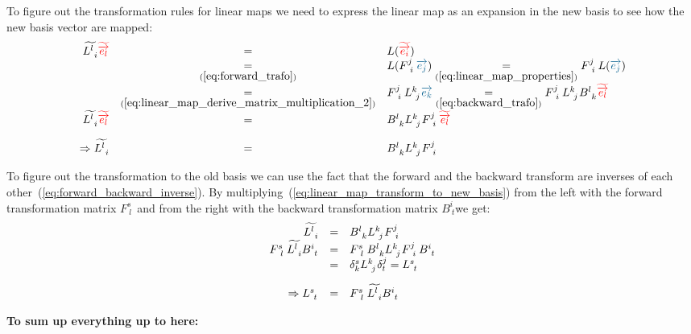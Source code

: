 To figure out the transformation rules for linear maps we need to express the linear map
as an expansion in the new basis to see how the new basis vector are mapped:
\begin{equation}
    \label{eq:linear_map_transform_to_new_basis}  
    \begin{array}{rcl}
        \widetilde{L^{l~}_{~i}}\hdbtv{l} & = & L(\hdbtv{i}) \\
        & \underset{(\ref{eq:forward_trafo})}{=} &
        L(F^{j~}_{~i}\hdbv{j}) \underset{(\ref{eq:linear_map_properties})}{=}
        F^{j~}_{~i}L(\hdbv{j}) \\
        & \underset{(\ref{eq:linear_map_derive_matrix_multiplication_2})}{=} &
        F^{j~}_{~i}L^{k~}_{~j}\hdbv{k} \underset{(\ref{eq:backward_trafo})}{=}
        F^{j~}_{~i}L^{k~}_{~j} B^{l~}_{~k}\hdbtv{l} \\
        \widetilde{L^{l~}_{~i}}\hdbtv{l} & = &
        B^{l~}_{~k} L^{k~}_{~j} F^{j~}_{~i} \hdbtv{l} \\
        \noalign{\vskip10pt}
        \Rightarrow \widetilde{L^{l~}_{~i}} & = &
        B^{l~}_{~k} L^{k~}_{~j} F^{j~}_{~i}
    \end{array}
\end{equation}

To figure out the transformation to the old basis we can use the fact that the forward and
the backward transform are inverses of each other~(\ref{eq:forward_backward_inverse}). By
multiplying~(\ref{eq:linear_map_transform_to_new_basis}) from the left with the forward
transformation matrix $F^{s~}_{~l}$ and from the right with the backward transformation
matrix $B^{i~}_{~t}$we get:
\begin{equation}
    \label{eq:linear_map_transform_to_old_basis}  
    \begin{array}{rcl}
        \widetilde{L^{l~}_{~i}} & = & B^{l~}_{~k} L^{k~}_{~j} F^{j~}_{~i} \\
        F^{s~}_{~l}\widetilde{L^{l~}_{~i}}B^{i~}_{~t} & = &
        F^{s~}_{~l}B^{l~}_{~k} L^{k~}_{~j} F^{j~}_{~i} B^{i~}_{~t} \\
        & = & \delta^s_k L^{k~}_{~j} \delta^j_t = L^{s~}_{~t} \\
        \noalign{\vskip10pt}
        \Rightarrow L^{s~}_{~t} & = & F^{s~}_{~l}\widetilde{L^{l~}_{~i}}B^{i~}_{~t}  
    \end{array}
\end{equation}

\textbf{To sum up everything up to here:}\\

